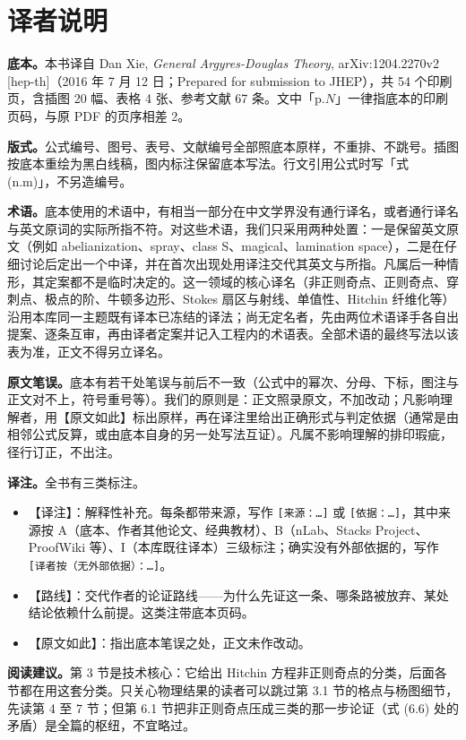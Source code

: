 \section*{译者说明}

\textbf{底本。}本书译自 Dan Xie, \emph{General Argyres-Douglas Theory}, arXiv:1204.2270v2 [hep-th]（2016 年 7 月 12 日；Prepared for submission to JHEP），共 54 个印刷页，含插图 20 幅、表格 4 张、参考文献 67 条。文中「p.$N$」一律指底本的印刷页码，与原 PDF 的页序相差 2。

\textbf{版式。}公式编号、图号、表号、文献编号全部照底本原样，不重排、不跳号。插图按底本重绘为黑白线稿，图内标注保留底本写法。行文引用公式时写「式 (n.m)」，不另造编号。

\textbf{术语。}底本使用的术语中，有相当一部分在中文学界没有通行译名，或者通行译名与英文原词的实际所指不符。对这些术语，我们只采用两种处置：一是保留英文原文（例如 abelianization、spray、class S、magical、lamination space），二是在仔细讨论后定出一个中译，并在首次出现处用译注交代其英文与所指。凡属后一种情形，其定案都不是临时决定的。这一领域的核心译名（非正则奇点、正则奇点、穿刺点、极点的阶、牛顿多边形、Stokes 扇区与射线、单值性、Hitchin 纤维化等）沿用本库同一主题既有译本已冻结的译法；尚无定名者，先由两位术语译手各自出提案、逐条互审，再由译者定案并记入工程内的术语表。全部术语的最终写法以该表为准，正文不得另立译名。

\textbf{原文笔误。}底本有若干处笔误与前后不一致（公式中的幂次、分母、下标，图注与正文对不上，符号重号等）。我们的原则是：正文照录原文，不加改动；凡影响理解者，用【原文如此】标出原样，再在译注里给出正确形式与判定依据（通常是由相邻公式反算，或由底本自身的另一处写法互证）。凡属不影响理解的排印瑕疵，径行订正，不出注。

\textbf{译注。}全书有三类标注。

\begin{itemize}
  \item 【译注】：解释性补充。每条都带来源，写作 \verb|[来源：…]| 或 \verb|[依据：…]|，其中来源按 A（底本、作者其他论文、经典教材）、B（nLab、Stacks Project、ProofWiki 等）、I（本库既往译本）三级标注；确实没有外部依据的，写作 \verb|[译者按（无外部依据）：…]|。
  \item 【路线】：交代作者的论证路线——为什么先证这一条、哪条路被放弃、某处结论依赖什么前提。这类注带底本页码。
  \item 【原文如此】：指出底本笔误之处，正文未作改动。
\end{itemize}

\textbf{阅读建议。}第 3 节是技术核心：它给出 Hitchin 方程非正则奇点的分类，后面各节都在用这套分类。只关心物理结果的读者可以跳过第 3.1 节的格点与杨图细节，先读第 4 至 7 节；但第 6.1 节把非正则奇点压成三类的那一步论证（式 (6.6) 处的矛盾）是全篇的枢纽，不宜略过。
